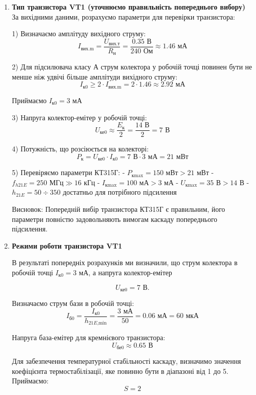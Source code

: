 \documentclass[main.tex]{subfiles}
\begin{document}
\begin{enumerate}
\item \textbf{Тип транзистора VT1 (уточнюємо правильність попереднього вибору)} \newline
За вихідними даними, розрахуємо параметри для перевірки транзистора:

1) Визначаємо амплітуду вихідного струму:
    \[I_{\text{вих.m}} = \frac{U_{\text{вих.т}}}{R_{\text{н}}} = \frac{0.35\text{ В}}{240\text{ Ом}} \approx 1.46\text{ мА}\]

2) Для підсилювача класу А струм колектора у робочій точці повинен бути не менше ніж удвічі більше амплітуди вихідного струму:
    \[I_{\text{к0}} \geq 2 \cdot I_{\text{вих.m}} = 2 \cdot 1.46 \approx 2.92\text{ мА}\]

    Приймаємо \(I_{\text{к0}} = 3\text{ мА}\)

3) Напруга колектор-емітер у робочій точці:
    \[U_{\text{ке0}} \approx \frac{E_{\text{к}}}{2} = \frac{14\text{ В}}{2} = 7\text{ В}\]

4) Потужність, що розсіюється на колекторі:
    \[P_{\text{к}} = U_{\text{ке0}} \cdot I_{\text{к0}} = 7\text{ В} \cdot 3\text{ мА} = 21\text{ мВт}\]

5) Перевіряємо параметри КТ315Г:
    - \(P_{\text{кmax}} = 150\text{ мВт} > 21\text{ мВт}\)
    - \(f_{h21E} = 250\text{ МГц} \gg 16\text{ кГц}\)
    - \(I_{\text{кmax}} = 100\text{ мА} > 3\text{ мА}\)
    - \(U_{\text{кmax}} = 35\text{ В} > 14\text{ В}\)
    - \(h_{21E} = 50 \div 350\) достатньо для потрібного підсилення

Висновок: Попередній вибір транзистора КТ315Г є правильним, його параметри повністю задовольняють вимогам каскаду попереднього підсилення.

\item \textbf{Режими роботи транзистора VT1} \newline

В результаті попередніх розрахунків ми визначили, що струм колектора в робочій точці $I_{\text{к0}} = 3$ мА, а напруга колектор-емітер 

\[U_{\text{ке0}} = 7\text{ В}.\]

Визначаємо струм бази в робочій точці:
\[I_{\text{б0}} = \frac{I_{\text{к0}}}{h_{21E\text{,min}}} = \frac{3\text{ мА}}{50} = 0.06\text{ мА} = 60\text{ мкА}\]

Напруга база-емітер для кремнієвого транзистора:
\[U_{\text{бе0}} \approx 0.65\text{ В}\]

Для забезпечення температурної стабільності каскаду, визначимо значення коефіцієнта термостабілізації, яке повинно бути в діапазоні від 1 до 5. Приймаємо:
\[S = 2\]


\end{enumerate}
\end{document}
